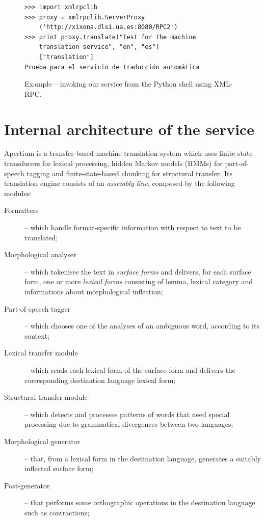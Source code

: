 \documentclass[11pt]{article}
\begin{document}
\begin{figure}
 \begin{Verbatim}[frame=single, fontfamily=courier, fontsize=\scriptsize]
>>> import xmlrpclib
>>> proxy = xmlrpclib.ServerProxy
	('http://xixona.dlsi.ua.es:8080/RPC2')
>>> print proxy.translate("Test for the machine 
	translation service", "en", "es")
	["translation"]
Prueba para el servicio de traducción automática
 \end{Verbatim}
 \caption{Example -- invoking our service from the Python shell using XML-RPC.}
 \label{fig:pythoninv}
\end{figure}

\section{Internal architecture of the service}

Apertium is a transfer-based machine translation system which uses finite-state transducers for lexical processing, hidden Markov models (HMMs) for part-of-speech tagging and finite-state-based chunking for structural transfer. Its translation engine consists of an \emph{assembly line}, composed by the following modules:

\begin{description}
 \item[Formatters] -- which handle format-specific information with respect to text to be translated;
 \item[Morphological analyser] -- which tokenises the text in \emph{surface forms} and delivers, for each surface form, one or more \emph{lexical forms} consisting of lemma, lexical category and informations about morphological inflection;
 \item[Part-of-speech tagger] -- which chooses one of the analyses of an ambiguous word, according to its context;
 \item[Lexical transfer module] -- which reads each lexical form of the surface form and delivers the corresponding destination language lexical form;
 \item[Structural transfer module] -- which detects and processes patterns of words that need special processing due to grammatical divergences between two languages;
 \item[Morphological generator] -- that, from a lexical form in the destination language, generates a suitably inflected surface form;
 \item[Post-generator] -- that performs some orthographic operations in the destination language such as contractions;
\end{description}
\end{document}
